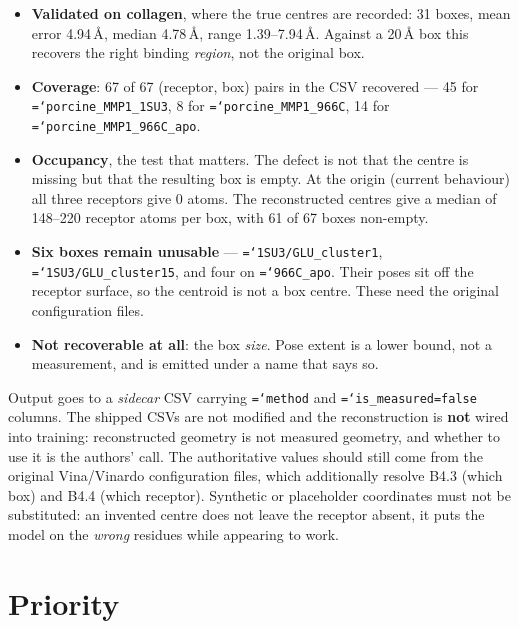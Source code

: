 \documentclass[11pt,a4paper]{article}
\newcommand{\ok}[1]{\textcolor{okgreen}{#1}}
\newcommand{\bad}[1]{\textcolor{badred}{#1}}
\newcommand{\code}[1]{\texttt{\small\hyphenchar\font=`\-\relax #1}}
\begin{document}
\begin{itemize}\itemsep1pt
  \item \textbf{Validated on collagen}, where the true centres are recorded:
        31 boxes, \ok{mean error 4.94\,\AA}, median 4.78\,\AA{}, range
        1.39--7.94\,\AA{}. Against a 20\,\AA{} box this recovers the right
        binding \emph{region}, not the original box.
  \item \textbf{Coverage}: \ok{67 of 67} (receptor, box) pairs in the CSV
        recovered --- 45 for \code{porcine\_MMP1\_1SU3}, 8 for
        \code{porcine\_MMP1\_966C}, 14 for \code{porcine\_MMP1\_966C\_apo}.
  \item \textbf{Occupancy}, the test that matters. The defect is not that the
        centre is missing but that the resulting box is empty. At the origin
        (current behaviour) all three receptors give \bad{0 atoms}. The
        reconstructed centres give a median of \ok{148--220 receptor atoms}
        per box, with \ok{61 of 67} boxes non-empty.
  \item \textbf{Six boxes remain unusable} --- \code{1SU3/GLU\_cluster1},
        \code{1SU3/GLU\_cluster15}, and four on \code{966C\_apo}. Their poses
        sit off the receptor surface, so the centroid is not a box centre.
        These need the original configuration files.
  \item \textbf{Not recoverable at all}: the box \emph{size}. Pose extent is a
        lower bound, not a measurement, and is emitted under a name that says
        so.
\end{itemize}

Output goes to a \emph{sidecar} CSV carrying \code{method} and
\code{is\_measured=false} columns. The shipped CSVs are not modified and the
reconstruction is \textbf{not} wired into training: reconstructed geometry is
not measured geometry, and whether to use it is the authors' call. The
authoritative values should still come from the original Vina/Vinardo
configuration files, which additionally resolve B4.3 (which box) and B4.4
(which receptor). Synthetic or placeholder coordinates must not be
substituted: an invented centre does not leave the receptor absent, it puts
the model on the \emph{wrong} residues while appearing to work.

\section{Priority}
\end{document}
